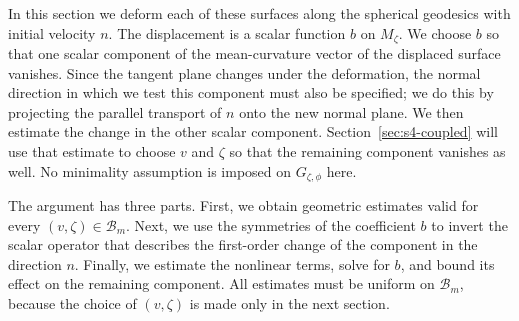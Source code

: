 \documentclass[a4paper,11pt,oneside,reqno]{amsart}
\numberwithin{equation}{section}
\theoremstyle{definition}
\begin{document}
In this section we deform each of these surfaces along the
spherical geodesics with initial velocity $n$. The displacement
is a scalar function $b$ on $M_\zeta$. We choose $b$ so that
one scalar component of the mean-curvature vector of the
displaced surface vanishes. Since the tangent plane changes
under the deformation, the normal direction in which we test
this component must also be specified; we do this by projecting
the parallel transport of $n$ onto the new normal plane.
We then estimate the change in the other scalar component.
Section~\ref{sec:s4-coupled} will use that estimate to choose
$v$ and $\zeta$ so that the remaining component vanishes as well.
No minimality assumption is imposed on $G_{\zeta,\phi}$ here.

The argument has three parts. First, we obtain geometric
estimates valid for every $(v,\zeta)\in\mathcal B_m$.
Next, we use the symmetries of the coefficient $b$ to invert
the scalar operator that describes the first-order change
of the component in the direction $n$. Finally, we estimate
the nonlinear terms, solve for $b$, and bound its effect on
the remaining component. All estimates must be uniform on
$\mathcal B_m$, because the choice of $(v,\zeta)$ is made
only in the next section.
\end{document}
